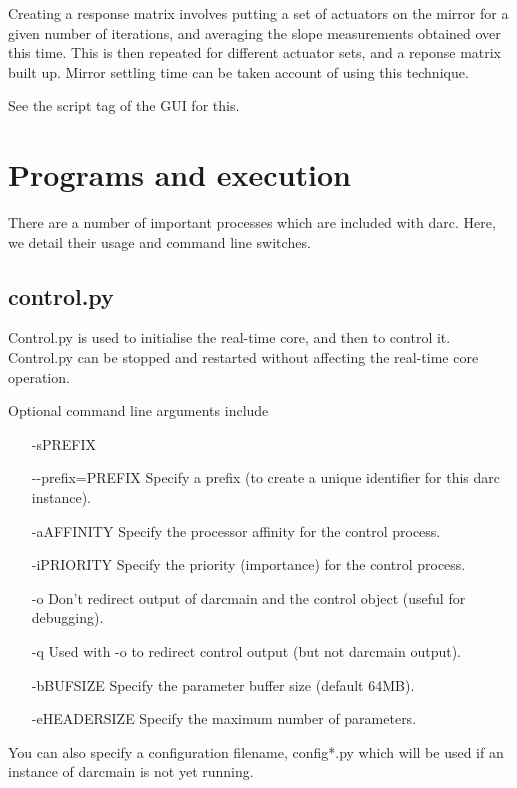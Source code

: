 \documentclass[a4,10pt]{article}
\begin{document}
Creating a response matrix involves putting a set of actuators on the
mirror for a given number of iterations, and averaging the slope
measurements obtained over this time.  This is then repeated for
different actuator sets, and a reponse matrix built up.  Mirror
settling time can be taken account of using this technique.

See the script tag of the GUI for this.

\section{Programs and execution}
There are a number of important processes which are included with
darc.  Here, we detail their usage and command line switches.

\subsection{control.py}
Control.py is used to initialise the real-time core, and then to
control it.  Control.py can be stopped and restarted without affecting
the real-time core operation.

Optional command line arguments include
\begin{center}
\begin{itemize}
\item[-sPREFIX]
\item[-{-}prefix=PREFIX] Specify a prefix (to create a unique
  identifier for this darc instance).
\item[-aAFFINITY] Specify the processor affinity for the control
  process.
\item[-iPRIORITY] Specify the priority (importance) for the control
  process.
\item[-o] Don't redirect output of darcmain and the control object
  (useful for debugging).
\item[-q] Used with -o to redirect control output (but not darcmain
  output).
\item[-bBUFSIZE] Specify the parameter buffer size (default 64MB).
\item[-eHEADERSIZE] Specify the maximum number of parameters.
\end{itemize}
\end{center}
You can also specify a configuration filename, config*.py which will
be used if an instance of darcmain is not yet running.
\end{document}
